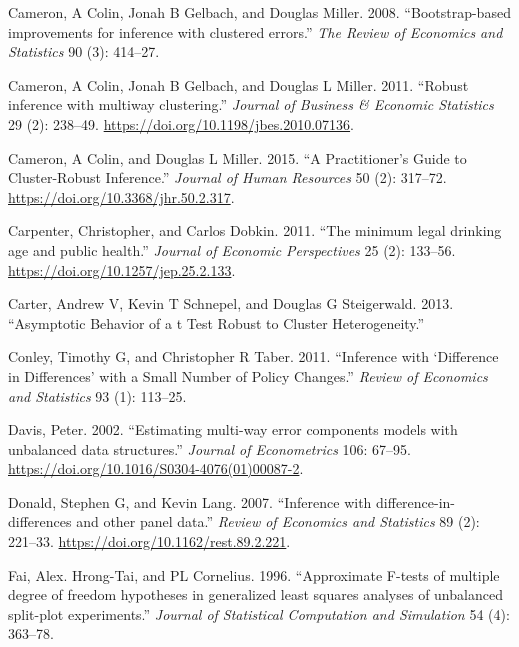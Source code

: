 \documentclass[12pt]{article}
\newlength{\cslhangindent}
\newlength{\cslentryspacingunit} %
\newenvironment{CSLReferences}[2] %
 {%
  \setlength{\parindent}{0pt}
  \ifodd #1
  \let\oldpar\par
  \def\par{\hangindent=\cslhangindent\oldpar}
  \fi
  \setlength{\parskip}{#2\cslentryspacingunit}
 }%
 {}
\begin{document}
\begin{CSLReferences}{1}{0}
\leavevmode{}%
Cameron, A Colin, Jonah B Gelbach, and Douglas Miller. 2008.
{``{Bootstrap-based improvements for inference with clustered
errors}.''} \emph{The Review of Economics and Statistics} 90 (3):
414--27.

\leavevmode{}%
Cameron, A Colin, Jonah B Gelbach, and Douglas L Miller. 2011.
{``{Robust inference with multiway clustering}.''} \emph{Journal of
Business {\&} Economic Statistics} 29 (2): 238--49.
\url{https://doi.org/10.1198/jbes.2010.07136}.

\leavevmode{}%
Cameron, A Colin, and Douglas L Miller. 2015. {``{A Practitioner's Guide
to Cluster-Robust Inference}.''} \emph{Journal of Human Resources} 50
(2): 317--72. \url{https://doi.org/10.3368/jhr.50.2.317}.

\leavevmode{}%
Carpenter, Christopher, and Carlos Dobkin. 2011. {``{The minimum legal
drinking age and public health}.''} \emph{Journal of Economic
Perspectives} 25 (2): 133--56.
\url{https://doi.org/10.1257/jep.25.2.133}.

\leavevmode{}%
Carter, Andrew V, Kevin T Schnepel, and Douglas G Steigerwald. 2013.
{``{Asymptotic Behavior of a t Test Robust to Cluster Heterogeneity}.''}

\leavevmode{}%
Conley, Timothy G, and Christopher R Taber. 2011. {``{Inference with
{`Difference in Differences'} with a Small Number of Policy Changes}.''}
\emph{Review of Economics and Statistics} 93 (1): 113--25.

\leavevmode{}%
Davis, Peter. 2002. {``{Estimating multi-way error components models
with unbalanced data structures}.''} \emph{Journal of Econometrics} 106:
67--95. \url{https://doi.org/10.1016/S0304-4076(01)00087-2}.

\leavevmode{}%
Donald, Stephen G, and Kevin Lang. 2007. {``{Inference with
difference-in-differences and other panel data}.''} \emph{Review of
Economics and Statistics} 89 (2): 221--33.
\url{https://doi.org/10.1162/rest.89.2.221}.

\leavevmode{}%
Fai, Alex. Hrong-Tai, and PL Cornelius. 1996. {``{Approximate F-tests of
multiple degree of freedom hypotheses in generalized least squares
analyses of unbalanced split-plot experiments}.''} \emph{Journal of
Statistical Computation and Simulation} 54 (4): 363--78.


\end{CSLReferences}
\end{document}
